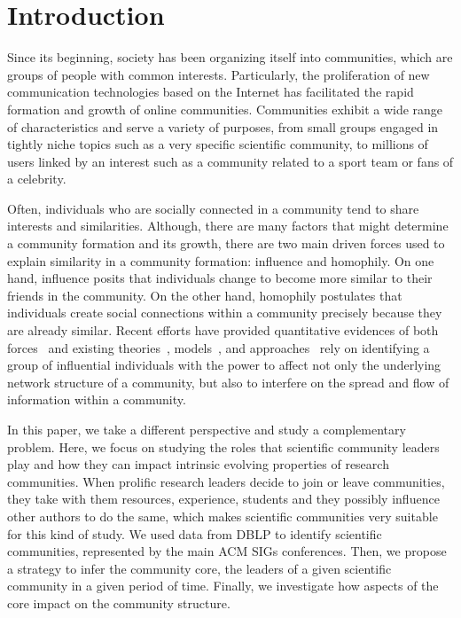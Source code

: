\section{Introduction}

Since its beginning, society has been organizing itself into communities, which are groups of people with common interests. Particularly, the proliferation of new communication
technologies based on the Internet has facilitated the rapid formation and growth of online communities. Communities exhibit a wide range of characteristics and serve a variety of
purposes, from small groups engaged in tightly niche topics such as a very specific scientific community, to millions of users linked by an interest such as a community related to
a sport team or fans of a celebrity. 

Often, individuals who are socially connected in a community tend to share interests and similarities. Although, there are many factors that might determine a community formation
and its growth, there are two main driven forces used to explain similarity in a community formation: influence and homophily. On one hand, influence posits that individuals change
to become more similar to their friends in the community. On the other hand, homophily postulates that individuals create social connections within a community precisely because
they are already similar. Recent efforts have provided quantitative evidences of both forces~\cite{icwsm10cha,crandall.kdd08,Backstrom:2006,influence.correlation.kdd08} and
existing theories~\cite{Rogers.1962,accidental-influential}, models~\cite{kempe03kdd,Kempe05influentialnodes}, and
approaches~\cite{saez-trumper@kdd12,Weng:2010:TFT:1718487.1718520} rely on identifying a group of influential individuals with the power to affect not only the underlying network
structure of a community, but also to interfere on the spread and flow of information within a community. 

In this paper, we take a different perspective and study a complementary problem. Here, we focus on studying the roles that scientific community leaders play and how they can impact intrinsic
evolving properties of research communities. When prolific research leaders decide to join or leave communities, they take with them resources,
experience, students and they possibly influence other authors to do the same, which makes scientific communities very suitable for this kind of study. We used data from DBLP to identify
scientific communities, represented by the main ACM SIGs conferences. Then, we propose a strategy to infer the community core, the leaders of a given scientific community in a
given period of time. Finally, we investigate how aspects of the core impact on the community structure. 

